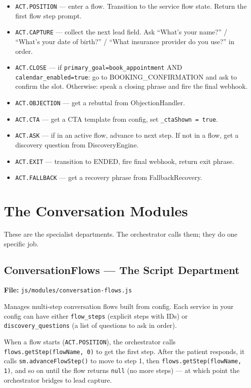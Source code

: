 \documentclass[12pt, a4paper]{report}
\newcommand{\ic}[1]{\texttt{\small\color{accentblue!70!black}#1}}
\begin{document}
\begin{itemize}
  \item \ic{ACT.POSITION} --- enter a flow. Transition to the service flow state.
        Return the first flow step prompt.
  \item \ic{ACT.CAPTURE} --- collect the next lead field. Ask ``What's your name?'' /
        ``What's your date of birth?'' / ``What insurance provider do you use?'' in
        order.
  \item \ic{ACT.CLOSE} --- if \ic{primary\_goal=book\_appointment} AND
        \ic{calendar\_enabled=true}: go to BOOKING\_CONFIRMATION and ask to confirm
        the slot. Otherwise: speak a closing phrase and fire the final webhook.
  \item \ic{ACT.OBJECTION} --- get a rebuttal from ObjectionHandler.
  \item \ic{ACT.CTA} --- get a CTA template from config, set \ic{\_ctaShown = true}.
  \item \ic{ACT.ASK} --- if in an active flow, advance to next step. If not in a flow,
        get a discovery question from DiscoveryEngine.
  \item \ic{ACT.EXIT} --- transition to ENDED, fire final webhook, return exit phrase.
  \item \ic{ACT.FALLBACK} --- get a recovery phrase from FallbackRecovery.
\end{itemize}

\chapter{The Conversation Modules}

These are the specialist departments. The orchestrator calls them; they do one specific
job.

\section{ConversationFlows --- The Script Department}

\textbf{File:} \ic{js/modules/conversation-flows.js}

Manages multi-step conversation flows built from config. Each service in your config can
have either \ic{flow\_steps} (explicit steps with IDs) or \ic{discovery\_questions} (a
list of questions to ask in order).

When a flow starts (\ic{ACT.POSITION}), the orchestrator calls
\ic{flows.getStep(flowName, 0)} to get the first step. After the patient responds, it
calls \ic{sm.advanceFlowStep()} to move to step 1, then \ic{flows.getStep(flowName, 1)},
and so on until the flow returns \ic{null} (no more steps) --- at which point the
orchestrator bridges to lead capture.
\end{document}
